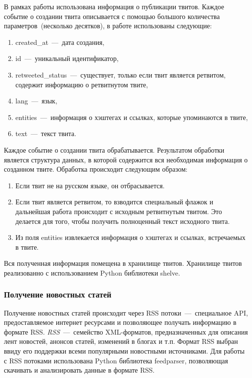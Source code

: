         В рамках работы использована информация о публикации твитов.
        Каждое событие о создании твита описывается с помощью большого количества параметров~(несколько десятков), в работе использованы следующие:
        \begin{enumerate}
            \item created\_at~---~дата создания,
            \item id~---~уникальный идентификатор,
            \item retweeted\_status~---~существует, только если твит является ретвитом, содержит информацию о ретвитнутом твите,
            \item lang~---~язык,
            \item entities~---~информация о хэштегах и ссылках, которые упоминаются  в твите,
            \item text~---~текст твита.
        \end{enumerate}

        Каждое событие о создании твита обрабатывается.
        Результатом обработки является структура данных, в которой содержится вся необходимая информация о созданном твите.
        Обработка происходит следующим образом:
        \begin{enumerate}
            \item Если твит не на русском языке, он отбрасывается.
            \item Если твит является ретвитом, то взводится специальный флажок и дальнейшая работа происходит с исходным ретвитнутым твитом.
            Это делается для того, чтобы получить полноценный текст исходного твита.
            \item Из поля entities извлекается информация о хэштегах и ссылках, встречаемых в твите.
        \end{enumerate}
        Вся полученная информация помещена в хранилище твитов. Хранилище твитов реализованно с использованием Python библиотеки shelve.

    \subsubsection{Получение новостных статей}
        Получение новостных статей происходит через RSS потоки~---~специальное API, предоставляемое интернет ресурсами и позволяющее получать информацию в формате RSS.
        \textit{RSS}~---~семейство XML-форматов, предназначенных для описания лент новостей, анонсов статей, изменений в блогах и т.п.
        Формат RSS выбран ввиду его поддержки всеми популярными новостными источниками.
        Для работы с RSS потоками использована Python библиотека feedparser, позволяющая скачивать и анализировать данные в формате RSS.

